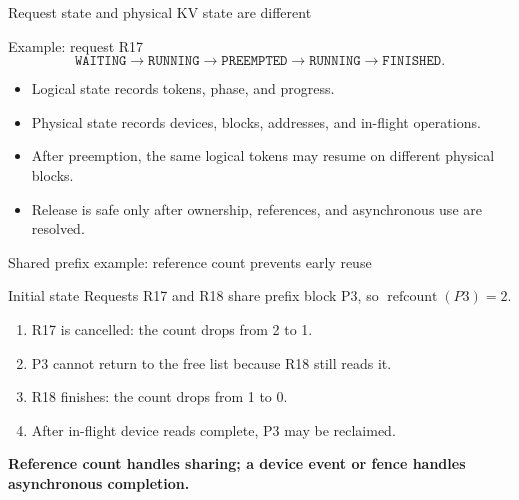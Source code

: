\documentclass[aspectratio=169,11pt]{beamer}
\newcommand{\key}[1]{\textcolor{HUSTDeep}{\textbf{#1}}}
\begin{document}
\begin{frame}{Request state and physical KV state are different}
  \begin{block}{Example: request R17}
    \[
      \texttt{WAITING}
      \rightarrow
      \texttt{RUNNING}
      \rightarrow
      \texttt{PREEMPTED}
      \rightarrow
      \texttt{RUNNING}
      \rightarrow
      \texttt{FINISHED}.
    \]
  \end{block}
  \begin{itemize}
    \item Logical state records tokens, phase, and progress.
    \item Physical state records devices, blocks, addresses, and in-flight operations.
    \item After preemption, the same logical tokens may resume on different physical blocks.
    \item Release is safe only after ownership, references, and asynchronous use are resolved.
  \end{itemize}
\end{frame}

\begin{frame}{Shared prefix example: reference count prevents early reuse}
  \begin{block}{Initial state}
    Requests R17 and R18 share prefix block P3, so \(\operatorname{refcount}(P3)=2\).
  \end{block}
  \begin{enumerate}
    \item R17 is cancelled: the count drops from 2 to 1.
    \item P3 cannot return to the free list because R18 still reads it.
    \item R18 finishes: the count drops from 1 to 0.
    \item After in-flight device reads complete, P3 may be reclaimed.
  \end{enumerate}
  \vspace{0.2cm}
  \key{Reference count handles sharing; a device event or fence handles asynchronous completion.}
\end{frame}
\end{document}
